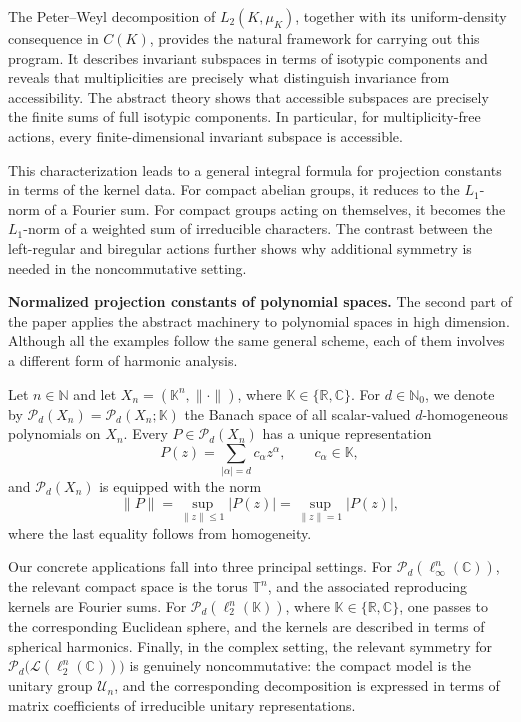 \documentclass[11pt,showkeys]{amsart}
\begin{document}
The Peter--Weyl decomposition of \(L_2(K,\mu_K)\), together with its
uniform-density consequence in \(C(K)\), provides the natural framework
for carrying out this program. It describes invariant subspaces in terms of isotypic
components and reveals that multiplicities are precisely what distinguish
invariance from accessibility. The abstract theory shows that accessible subspaces are precisely the finite sums of full isotypic components.
In particular, for multiplicity-free actions, every finite-dimensional
invariant subspace is accessible.

This characterization leads to a general integral formula for projection
constants in terms of the kernel data. For compact
abelian groups, it reduces to the \(L_1\)-norm of a Fourier sum. For compact
groups acting on themselves, it becomes the \(L_1\)-norm of a weighted sum
of irreducible characters. The contrast between the left-regular and
biregular actions further shows why additional symmetry is needed in the
noncommutative setting.



\medskip

\noindent

\textbf{Normalized projection constants of polynomial spaces.}
The second part of the paper applies the abstract machinery to polynomial
spaces in high dimension. Although all the examples follow the same general
scheme, each of them involves a different form of harmonic analysis.

Let $n\in\mathbb N$ and let
$X_n=(\mathbb K^n,\|\cdot\|)$, where
$\mathbb K\in\{\mathbb R,\mathbb C\}$. For $d\in\mathbb N_0$, we
denote by
$\mathcal P_d(X_n)=\mathcal P_d(X_n;\mathbb K)$
the Banach space of all scalar-valued $d$-homogeneous polynomials on
$X_n$. Every $P\in\mathcal P_d(X_n)$ has a unique representation
\[
P(z)=\sum_{|\alpha|=d}c_\alpha z^\alpha, \qquad c_\alpha\in\mathbb K,
\]
and $\mathcal P_d(X_n)$ is equipped with the norm
\[
\|P\|=\sup_{\|z\|\leq 1}|P(z)|=\sup_{\|z\|=1}|P(z)|,
\]
where the last equality follows from homogeneity.

Our concrete applications fall into three principal settings. For
$\mathcal P_d(\ell_\infty^n(\mathbb C))$, the relevant compact space
is the torus $\mathbb T^n$, and the associated reproducing kernels are
Fourier sums. For
$\mathcal P_d(\ell_2^n(\mathbb K))$, where
$\mathbb K\in\{\mathbb R,\mathbb C\}$, one passes to the corresponding
Euclidean sphere, and the kernels are described in terms of spherical
harmonics. Finally, in the complex setting, the relevant symmetry for
$\mathcal P_d\bigl(\mathcal L(\ell_2^n(\mathbb C))\bigr)$ is genuinely
noncommutative: the compact model is the unitary group $\mathcal U_n$,
and the corresponding decomposition is expressed in terms of matrix
coefficients of irreducible unitary representations.
\end{document}
